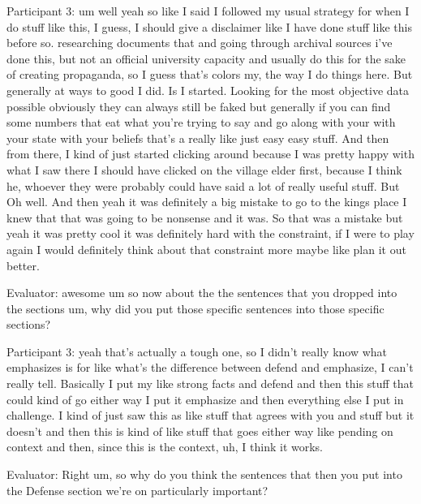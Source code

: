\documentclass{l4proj}
\begin{document}
\begin{appendices}
Participant 3: um well yeah so like I said I followed my usual strategy for when I do stuff like this, I guess, I should give a disclaimer like I have done stuff like this before so. researching documents that and going through archival sources i've done this, but not an official university capacity and usually do this for the sake of creating propaganda, so I guess that's colors my, the way I do things here. But generally at ways to good I did. Is I started. Looking for the most objective data possible obviously they can always still be faked but generally if you can find some numbers that eat what you're trying to say and go along with your with your state with your beliefs that's a really like just easy easy stuff. And then from there, I kind of just started clicking around because I was pretty happy with what I saw there I should have clicked on the village elder first, because I think he, whoever they were probably could have said a lot of really useful stuff. But Oh well. And then yeah it was definitely a big mistake to go to the kings place I knew that that was going to be nonsense and it was. So that was a mistake but yeah it was pretty cool it was definitely hard with the constraint, if I were to play again I would definitely think about that constraint more maybe like plan it out better.

Evaluator: awesome um so now about the the sentences that you dropped into the sections um, why did you put those specific sentences into those specific sections?

 

Participant 3: yeah that's actually a tough one, so I didn't really know what emphasizes is for like what's the difference between defend and emphasize, I can't really tell. Basically I put my like strong facts and defend and then this stuff that could kind of go either way I put it emphasize and then everything else I put in challenge. I kind of just saw this as like stuff that agrees with you and stuff but it doesn't and then this is kind of like stuff that goes either way like pending on context and then, since this is the context, uh, I think it works. 

 

Evaluator: Right um, so why do you think the sentences that then you put into the Defense section we're on particularly important?


\end{appendices}
\end{document}
